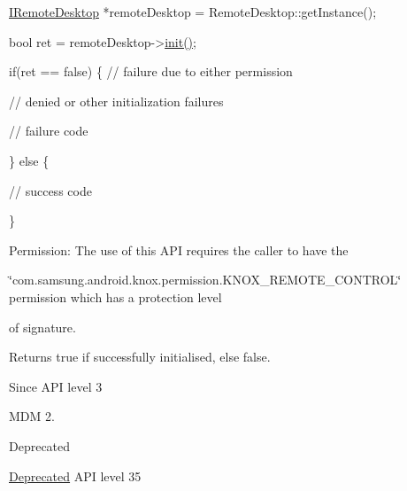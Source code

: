 \begin{DoxyPre}  \hyperlink{classknoxremotedesktop_1_1IRemoteDesktop}{IRemoteDesktop} *remoteDesktop = RemoteDesktop::getInstance();\end{DoxyPre}



\begin{DoxyPre}  bool ret = remoteDesktop->\hyperlink{classknoxremotedesktop_1_1IRemoteDesktop_a7bed40d98c61713a69cf1dad8b37beae}{init()};\end{DoxyPre}



\begin{DoxyPre}  if(ret == false)  \{ // failure due to either permission\end{DoxyPre}



\begin{DoxyPre}                      // denied or other initialization failures\end{DoxyPre}



\begin{DoxyPre}     // failure code\end{DoxyPre}



\begin{DoxyPre}  \} else \{\end{DoxyPre}



\begin{DoxyPre}     // success code\end{DoxyPre}



\begin{DoxyPre}  \}\end{DoxyPre}



\begin{DoxyPre} \end{DoxyPre}


\begin{DoxyParagraph}{\-Permission\-: }
\-The use of this \-A\-P\-I requires the caller to have the
\end{DoxyParagraph}
\char`\"{}com.\-samsung.\-android.\-knox.\-permission.\-K\-N\-O\-X\-\_\-\-R\-E\-M\-O\-T\-E\-\_\-\-C\-O\-N\-T\-R\-O\-L\char`\"{} permission which has a protection level

of signature.

\begin{DoxyReturn}{\-Returns}
{\ttfamily true} if successfully initialised, else {\ttfamily false}.
\end{DoxyReturn}
\begin{DoxySince}{\-Since}
\-A\-P\-I level 3

\-M\-D\-M 2.
\end{DoxySince}
\begin{DoxyRefDesc}{\-Deprecated}
\item[\hyperlink{deprecated__deprecated000020}{\-Deprecated}]\-A\-P\-I level 35\end{DoxyRefDesc}


